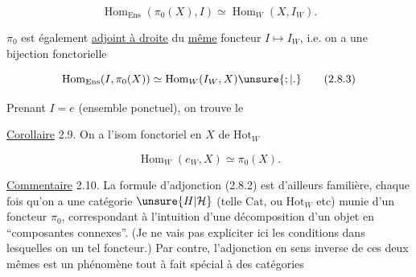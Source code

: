 
\[
 \operatorname{Hom}_{\mathrm{Ens}}(\pi_0(X),I)\simeq\operatorname{Hom}_W(X,I_W).
 \tag*{(2.8.2)}
\]

  $\pi_0$ est également \uline{adjoint à droite} du \uline{même} foncteur $I\mapsto I_W$, i.e. on a une bijection fonctorielle

\[
 \operatorname{Hom}_{\mathrm{Ens}}(I,\pi_0(X))\simeq\operatorname{Hom}_W(I_W,X)\unsure{;|.}
 \tag*{(2.8.3)}
\]

Prenant $I=e$ (ensemble ponctuel), on trouve le 

\uline{Corollaire} 2.9.  On a  l'isom fonctoriel en $X$ de $\mathrm{Hot}_W$

\[
 \boxed{\operatorname{Hom}_W(e_W,X)\simeq\pi_0(X)}. \tag*{(2.8.4)}
\]

\uline{Commentaire} 2.10. La formule d'adjonction (2.8.2) est d'ailleurs familière, chaque fois qu'on a une catégorie $\unsure{H|\mathcal{H}}$ (telle $\mathrm{Cat}$, ou $\mathrm{Hot}_W$ etc) munie d'un foncteur $\pi_0$,  correspondant à l'intuition d'une décomposition d'un objet en ``composantes connexes''. (Je ne vais pas expliciter ici les conditions  dans lesquelles on  un tel foncteur.) Par contre, l'adjonction en sens inverse de ces deux mêmes  est un phénomène tout à fait spécial à des catégories

